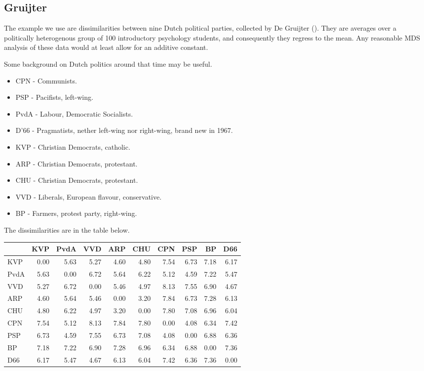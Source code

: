 \documentclass[
  12pt,
  letterpaper,
  DIV=11,
  numbers=noendperiod]{scrartcl}
\providecommand{\tightlist}{%
  \setlength{\itemsep}{0pt}\setlength{\parskip}{0pt}}\usepackage{longtable,booktabs,array}
\theoremstyle{definition}
\theoremstyle{plain}
\theoremstyle{plain}
\theoremstyle{remark}
\begin{document}
\subsection{Gruijter}\label{gruijter}

The example we use are dissimilarities between nine Dutch political
parties, collected by De Gruijter ().
They are averages over a politically heterogenous group of 100
introductory psychology students, and consequently they regress to the
mean. Any reasonable MDS analysis of these data would at least allow for
an additive constant.

Some background on Dutch politics around that time may be useful.

\begin{itemize}
\tightlist
\item
  CPN - Communists.
\item
  PSP - Pacifists, left-wing.
\item
  PvdA - Labour, Democratic Socialists.
\item
  D'66 - Pragmatists, nether left-wing nor right-wing, brand new in
  1967.
\item
  KVP - Christian Democrats, catholic.
\item
  ARP - Christian Democrats, protestant.
\item
  CHU - Christian Democrats, protestant.
\item
  VVD - Liberals, European flavour, conservative.
\item
  BP - Farmers, protest party, right-wing.
\end{itemize}

The dissimilarities are in the table below.

\begin{longtable}[]{@{}lrrrrrrrrr@{}}
\toprule\noalign{}
& KVP & PvdA & VVD & ARP & CHU & CPN & PSP & BP & D66 \\
\midrule\noalign{}
\endhead
\bottomrule\noalign{}
\endlastfoot
KVP & 0.00 & 5.63 & 5.27 & 4.60 & 4.80 & 7.54 & 6.73 & 7.18 & 6.17 \\
PvdA & 5.63 & 0.00 & 6.72 & 5.64 & 6.22 & 5.12 & 4.59 & 7.22 & 5.47 \\
VVD & 5.27 & 6.72 & 0.00 & 5.46 & 4.97 & 8.13 & 7.55 & 6.90 & 4.67 \\
ARP & 4.60 & 5.64 & 5.46 & 0.00 & 3.20 & 7.84 & 6.73 & 7.28 & 6.13 \\
CHU & 4.80 & 6.22 & 4.97 & 3.20 & 0.00 & 7.80 & 7.08 & 6.96 & 6.04 \\
CPN & 7.54 & 5.12 & 8.13 & 7.84 & 7.80 & 0.00 & 4.08 & 6.34 & 7.42 \\
PSP & 6.73 & 4.59 & 7.55 & 6.73 & 7.08 & 4.08 & 0.00 & 6.88 & 6.36 \\
BP & 7.18 & 7.22 & 6.90 & 7.28 & 6.96 & 6.34 & 6.88 & 0.00 & 7.36 \\
D66 & 6.17 & 5.47 & 4.67 & 6.13 & 6.04 & 7.42 & 6.36 & 7.36 & 0.00 \\
\end{longtable}
\end{document}
